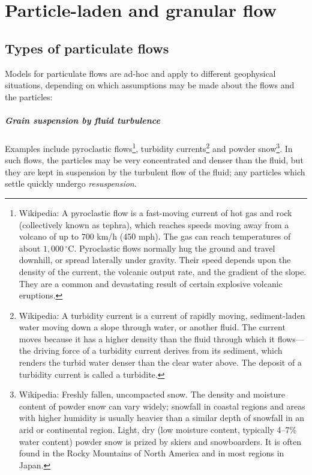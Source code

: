 \newpage
\chapter{Particle-laden and granular flow} \label{section-nmv}

\section{Types of particulate flows}

Models for particulate flows are ad-hoc and apply to different geophysical situations, depending on which assumptions may be made about the flows and the particles:

\paragraph{Grain suspension by fluid turbulence} Examples include pyroclastic
flows\footnote{Wikipedia: A pyroclastic flow is a fast-moving current of hot gas
    and rock (collectively known as tephra), which reaches speeds moving away
    from a volcano of up to 700 km/h (450 mph). The gas can reach temperatures
    of about $1,000\,^{\circ}\mathrm{C}$. Pyroclastic flows normally hug the
    ground and travel downhill, or spread laterally under gravity. Their speed
    depends upon the density of the current, the volcanic output rate, and the
    gradient of the slope. They are a common and devastating result of certain
explosive volcanic eruptions.}, turbidity currents\footnote{Wikipedia: A
    turbidity current is a current of rapidly moving, sediment-laden water
    moving down a slope through water, or another fluid. The current moves
    because it has a higher density than the fluid through which it flows—the
    driving force of a turbidity current derives from its sediment, which
    renders the turbid water denser than the clear water above. The deposit of a
turbidity current is called a turbidite.} and powder snow\footnote{Wikipedia:
    Freshly fallen, uncompacted snow. The density and moisture content of powder
    snow can vary widely; snowfall in coastal regions and areas with higher
    humidity is usually heavier than a similar depth of snowfall in an arid or
    continental region. Light, dry (low moisture content, typically 4–7\% water
    content) powder snow is prized by skiers and snowboarders. It is often found
in the Rocky Mountains of North America and in most regions in Japan.}. In such
flows, the particles may be very concentrated and denser than the fluid, but
they are kept in suspension by the turbulent flow of the fluid; any particles
which settle quickly undergo \textit{resuspension}.


